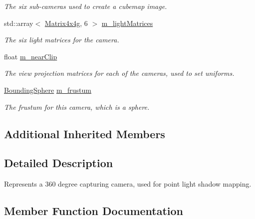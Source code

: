 \begin{Indent}
\begin{DoxyCompactItemize}
\begin{DoxyCompactList}\small\item\em The six sub-\/cameras used to create a cubemap image. \end{DoxyCompactList}\item 
\mbox{\label{classrev_1_1_point_light_camera_aaaebfc2c82260e340d1c34794e0d8d24}} 
std\+::array$<$ \mbox{\hyperlink{classrev_1_1_square_matrix}{Matrix4x4g}}, 6 $>$ \mbox{\hyperlink{classrev_1_1_point_light_camera_aaaebfc2c82260e340d1c34794e0d8d24}{m\+\_\+light\+Matrices}}
\begin{DoxyCompactList}\small\item\em The six light matrices for the camera. \end{DoxyCompactList}\item 
float \mbox{\hyperlink{classrev_1_1_point_light_camera_a79b57ce810bf4f59058643886f7abca0}{m\+\_\+near\+Clip}}
\begin{DoxyCompactList}\small\item\em The view projection matrices for each of the cameras, used to set uniforms. \end{DoxyCompactList}\item 
\mbox{\label{classrev_1_1_point_light_camera_a5d8fd9025d565c2052bdf3b7c0749efd}} 
\mbox{\hyperlink{classrev_1_1_bounding_sphere}{Bounding\+Sphere}} \mbox{\hyperlink{classrev_1_1_point_light_camera_a5d8fd9025d565c2052bdf3b7c0749efd}{m\+\_\+frustum}}
\begin{DoxyCompactList}\small\item\em The frustum for this camera, which is a sphere. \end{DoxyCompactList}\end{DoxyCompactItemize}
\end{Indent}
\subsection*{Additional Inherited Members}


\subsection{Detailed Description}
Represents a 360 degree capturing camera, used for point light shadow mapping. 

\subsection{Member Function Documentation}
\mbox{\label{classrev_1_1_point_light_camera_a461e93ecc428b95ad7b7a244e143f924}} 
